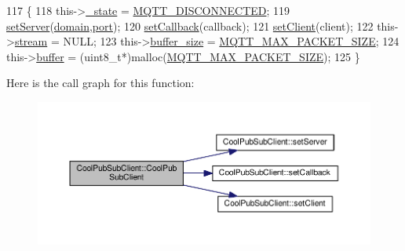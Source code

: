 \begin{DoxyCode}
117                                                                                                            
        \{
118     this->\hyperlink{class_cool_pub_sub_client_aa1953b601206252a30efa5b114eb3e1a}{\_state} = \hyperlink{_cool_pub_sub_client_8h_adaf86a906a305dd129164982d50111b3}{MQTT\_DISCONNECTED};
119     \hyperlink{class_cool_pub_sub_client_a947e70c394c66c7d08d0c53caf8425e3}{setServer}(\hyperlink{class_cool_pub_sub_client_a08d3a5619724f3408ad406ca4fb776e1}{domain},\hyperlink{class_cool_pub_sub_client_a01e3249102c057756af7a515c179844e}{port});
120     \hyperlink{class_cool_pub_sub_client_ac5cab7658f1bdded32131241e468e661}{setCallback}(callback);
121     \hyperlink{class_cool_pub_sub_client_a7ee119b786010561ab6a9afa0798e91d}{setClient}(client);
122     this->\hyperlink{class_cool_pub_sub_client_a7a92417b317e7bd9502ed37752111705}{stream} = NULL;
123     this->\hyperlink{class_cool_pub_sub_client_ae6cb10e42c057483d53516ac830ab526}{buffer\_size} = \hyperlink{_cool_pub_sub_client_8h_ae09b594688a59f1427c7e45259e039b9}{MQTT\_MAX\_PACKET\_SIZE};
124     this->\hyperlink{class_cool_pub_sub_client_a7e8bcc6096626916046a51bebadc7851}{buffer} = (uint8\_t*)malloc(\hyperlink{_cool_pub_sub_client_8h_ae09b594688a59f1427c7e45259e039b9}{MQTT\_MAX\_PACKET\_SIZE});
125 \}
\end{DoxyCode}
Here is the call graph for this function\+:\nopagebreak
\begin{figure}[H]
\begin{center}
\leavevmode
\includegraphics[width=350pt]{d8/d4b/class_cool_pub_sub_client_a2aea0a9487dc15b9db1caf0f069eb877_cgraph}
\end{center}
\end{figure}
\mbox{\label{class_cool_pub_sub_client_a6466f55abe5820d410b1c9cf7a70ec7e}} 
